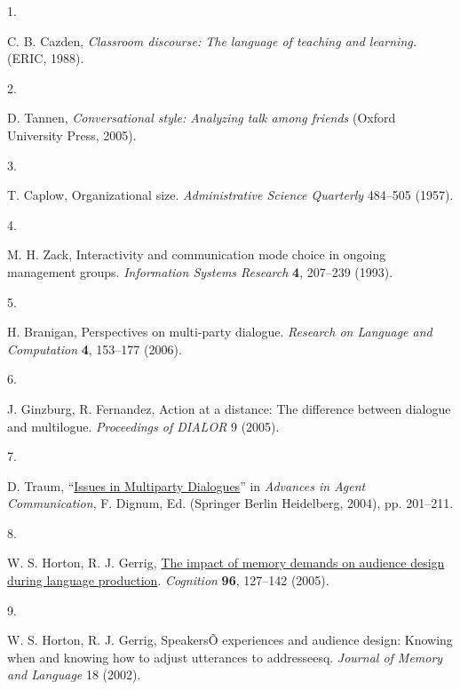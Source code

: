 \documentclass[9pt,twocolumn,twoside]{pnas-new}
\makeatletter
\newlength{\cslhangindent}
\newlength{\csllabelwidth}
\newenvironment{CSLReferences}[2] %
 {\begin{list}{}{%
  \setlength{\itemindent}{0pt}
  \setlength{\leftmargin}{0pt}
  \setlength{\parsep}{0pt}
   \normalfont\sffamily\fontsize{6}{8}\selectfont
    \labelsep2.8pt
   \renewcommand\newblock{\hskip .11em \@plus.33em \@minus.07em}
  \ifodd #1
   \setlength{\leftmargin}{\cslhangindent}
   \setlength{\itemindent}{-1\cslhangindent}
  \fi
  \setlength{\itemsep}{0.0pt}}}
 {\end{list}}
\newcommand{\CSLLeftMargin}[1]{\parbox[t]{\csllabelwidth}{#1}}
\newcommand{\CSLRightInline}[1]{\parbox[t]{\linewidth - \csllabelwidth}{#1}\break}
\makeatother
\begin{document}
\showmatmethods
\showacknow

\bibsplit[8]

\begin{CSLReferences}{0}{1}
	\CSLLeftMargin{1. }%
	\CSLRightInline{C. B. Cazden, \emph{Classroom discourse: The language of
			teaching and learning.} (ERIC, 1988).}
	
	\CSLLeftMargin{2. }%
	\CSLRightInline{D. Tannen, \emph{Conversational style: Analyzing talk
			among friends} (Oxford University Press, 2005).}
	
	\CSLLeftMargin{3. }%
	\CSLRightInline{T. Caplow, Organizational size. \emph{Administrative
			Science Quarterly} 484--505 (1957).}
	
	\CSLLeftMargin{4. }%
	\CSLRightInline{M. H. Zack, Interactivity and communication mode choice
		in ongoing management groups. \emph{Information Systems Research}
		\textbf{4}, 207--239 (1993).}
	
	\CSLLeftMargin{5. }%
	\CSLRightInline{H. Branigan, Perspectives on multi-party dialogue.
		\emph{Research on Language and Computation} \textbf{4}, 153--177
		(2006).}
	
	\CSLLeftMargin{6. }%
	\CSLRightInline{J. Ginzburg, R. Fernandez, Action at a distance: The
		difference between dialogue and multilogue. \emph{Proceedings of DIALOR}
		9 (2005).}
	
	\CSLLeftMargin{7. }%
	\CSLRightInline{D. Traum,
		{``\href{https://doi.org/10.1007/978-3-540-24608-4_12}{Issues in
				{Multiparty Dialogues}}''} in \emph{Advances in {Agent Communication}},
		F. Dignum, Ed. ({Springer Berlin Heidelberg}, 2004), pp. 201--211.}
	
	\CSLLeftMargin{8. }%
	\CSLRightInline{W. S. Horton, R. J. Gerrig,
		\href{https://doi.org/10.1016/j.cognition.2004.07.001}{The impact of
			memory demands on audience design during language production}.
		\emph{Cognition} \textbf{96}, 127--142 (2005).}
	
	\CSLLeftMargin{9. }%
	\CSLRightInline{W. S. Horton, R. J. Gerrig, {SpeakersÕ} experiences and
		audience design: Knowing when and knowing how to adjust utterances to
		addresseesq. \emph{Journal of Memory and Language} 18 (2002).}
	

\end{CSLReferences}
\end{document}
